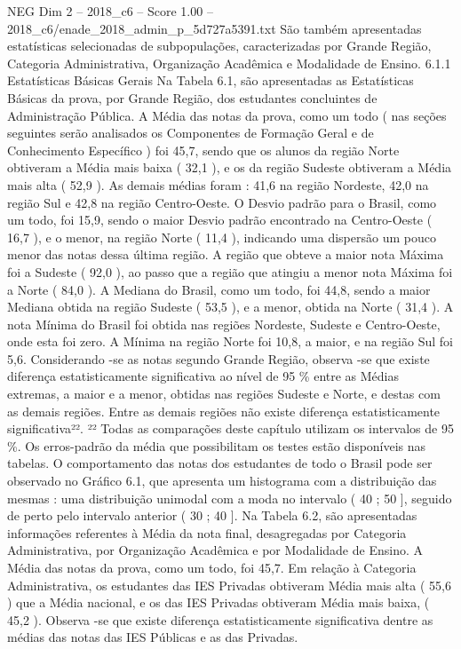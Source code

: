 \begin{textsample}{NEG Dim 2 – 2018\_c6 – Score 1.00 – 2018\_c6/enade\_2018\_admin\_p\_5d727a5391.txt}
São também apresentadas estatísticas selecionadas de subpopulações, caracterizadas por Grande Região, Categoria Administrativa, Organização Acadêmica e Modalidade de Ensino. 6.1.1 Estatísticas Básicas Gerais Na Tabela 6.1, são apresentadas as Estatísticas Básicas da prova, por Grande Região, dos estudantes concluintes de Administração Pública.
A Média das notas da prova, como um todo ( nas seções seguintes serão analisados os Componentes de Formação Geral e de Conhecimento Específico ) foi 45,7, sendo que os alunos da região Norte obtiveram a Média mais baixa ( 32,1 ), e os da região Sudeste obtiveram a Média mais alta ( 52,9 ).
As demais médias foram : 41,6 na região Nordeste, 42,0 na região Sul e 42,8 na região Centro-Oeste.
O Desvio padrão para o Brasil, como um todo, foi 15,9, sendo o maior Desvio padrão encontrado na Centro-Oeste ( 16,7 ), e o menor, na região Norte ( 11,4 ), indicando uma dispersão um pouco menor das notas dessa última região.
A região que obteve a maior nota Máxima foi a Sudeste ( 92,0 ), ao passo que a região que atingiu a menor nota Máxima foi a Norte ( 84,0 ).
A Mediana do Brasil, como um todo, foi 44,8, sendo a maior Mediana obtida na região Sudeste ( 53,5 ), e a menor, obtida na Norte ( 31,4 ).
A nota Mínima do Brasil foi obtida nas regiões Nordeste, Sudeste e Centro-Oeste, onde esta foi zero.
A Mínima na região Norte foi 10,8, a maior, e na região Sul foi 5,6.
Considerando -se as notas segundo Grande Região, observa -se que existe diferença estatisticamente significativa ao nível de 95 \% entre as Médias extremas, a maior e a menor, obtidas nas regiões Sudeste e Norte, e destas com as demais regiões.
Entre as demais regiões não existe diferença estatisticamente significativa²². ²² Todas as comparações deste capítulo utilizam os intervalos de 95 \%.
Os erros-padrão da média que possibilitam os testes estão disponíveis nas tabelas.
O comportamento das notas dos estudantes de todo o Brasil pode ser observado no Gráfico 6.1, que apresenta um histograma com a distribuição das mesmas : uma distribuição unimodal com a moda no intervalo ( 40 ; 50 ], seguido de perto pelo intervalo anterior ( 30 ; 40 ].
Na Tabela 6.2, são apresentadas informações referentes à Média da nota final, desagregadas por Categoria Administrativa, por Organização Acadêmica e por Modalidade de Ensino.
A Média das notas da prova, como um todo, foi 45,7.
Em relação à Categoria Administrativa, os estudantes das IES Privadas obtiveram Média mais alta ( 55,6 ) que a Média nacional, e os das IES Privadas obtiveram Média mais baixa, ( 45,2 ).
Observa -se que existe diferença estatisticamente significativa dentre as médias das notas das IES Públicas e as das Privadas.

\end{textsample}

